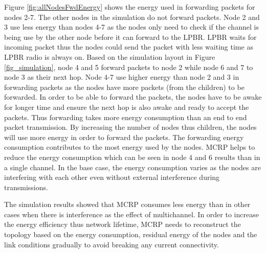 Figure \ref{fig:allNodesFwdEnergy} shows the energy used in forwarding packets for nodes 2-7. The other nodes in the simulation do not forward packets. Node 2 and 3 use less energy than nodes 4-7 as the nodes only need to check if the channel is being use by the other node before it can forward to the LPBR. LPBR waits for incoming packet thus the nodes could send the packet with less waiting time as LPBR radio is always on. Based on the simulation layout in Figure \ref{fig_simulation}, node 4 and 5 forward packets to node 2 while node 6 and 7 to node 3 as their next hop. Node 4-7 use higher energy than node 2 and 3 in forwarding packets as the nodes have more packets (from the children) to be forwarded. In order to be able to forward the packets, the nodes have to be awake for longer time and ensure the next hop is also awake and ready to accept the packets. Thus forwarding takes more energy consumption than an end to end packet transmission. By increasing the number of nodes thus children, the nodes will use more energy in order to forward the packets. The forwarding energy consumption contributes to the most energy used by the nodes. MCRP helps to reduce the energy consumption which can be seen in node 4 and 6 results than in a single channel. In the base case, the energy consumption varies as the nodes are interfering with each other even without external interference during transmissions.


The simulation results showed that MCRP consumes less energy than in other cases when there is interference as the effect of multichannel. In order to increase the energy efficiency thus network lifetime, MCRP needs to reconstruct the topology based on the energy consumption, residual energy of the nodes and the link conditions gradually to avoid breaking any current connectivity.
